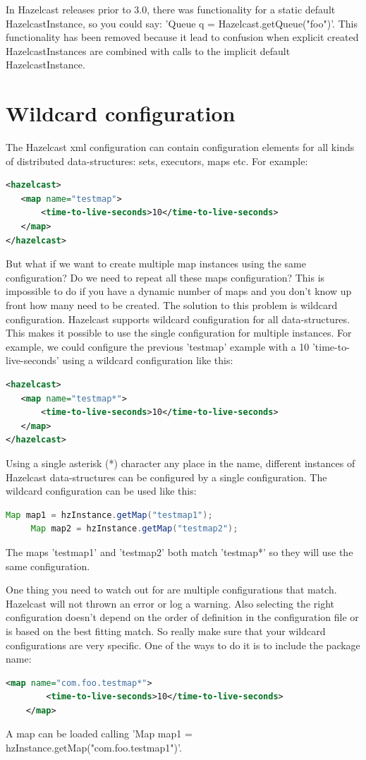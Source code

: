 In Hazelcast releases prior to 3.0, there was functionality for a static default HazelcastInstance, so you could say: 'Queue q = Hazelcast.getQueue("foo")'. This functionality has been removed because it lead to confusion when explicit created HazelcastInstances are combined with calls to the implicit default HazelcastInstance.

\section{Wildcard configuration}
The Hazelcast xml configuration can contain configuration elements for all kinds of distributed data-structures: sets, executors, maps etc. For example:
\begin{lstlisting}[language=xml]
<hazelcast>
   <map name="testmap">
       <time-to-live-seconds>10</time-to-live-seconds>
   </map>
</hazelcast>
\end{lstlisting}
But what if we want to create multiple map instances using the same configuration? Do we need to repeat all these maps configuration? This is impossible to do if you have a dynamic number of maps and you don't know up front how many need to be created. The solution to this problem is wildcard configuration. Hazelcast supports wildcard configuration for all data-structures. This makes it possible to use the single configuration for multiple instances. For example, we could configure the previous 'testmap' example with a 10 'time-to-live-seconds' using a wildcard configuration like this:
\begin{lstlisting}[language=xml]
<hazelcast>
   <map name="testmap*">
       <time-to-live-seconds>10</time-to-live-seconds>
   </map>
</hazelcast>
\end{lstlisting}
Using a single asterisk (*) character any place in the name, different instances of Hazelcast data-structures can be configured by a single configuration. The wildcard configuration can be used like this:
\begin{lstlisting}[language=java]
     Map map1 = hzInstance.getMap("testmap1");
     Map map2 = hzInstance.getMap("testmap2");
\end{lstlisting}
The maps 'testmap1' and 'testmap2' both match 'testmap*' so they will use the same configuration.

One thing you need to watch out for are multiple configurations that match. Hazelcast will not thrown an error or log a warning. Also selecting the right configuration doesn't depend on the order of definition in the configuration file or is based on the best fitting match. So really make sure that your wildcard configurations are very specific. One of the ways to do it is to include the package name:
\begin{lstlisting}[language=xml]
    <map name="com.foo.testmap*">
        <time-to-live-seconds>10</time-to-live-seconds>
    </map>
\end{lstlisting}
A map can be loaded calling 'Map map1 = hzInstance.getMap("com.foo.testmap1")'. 

